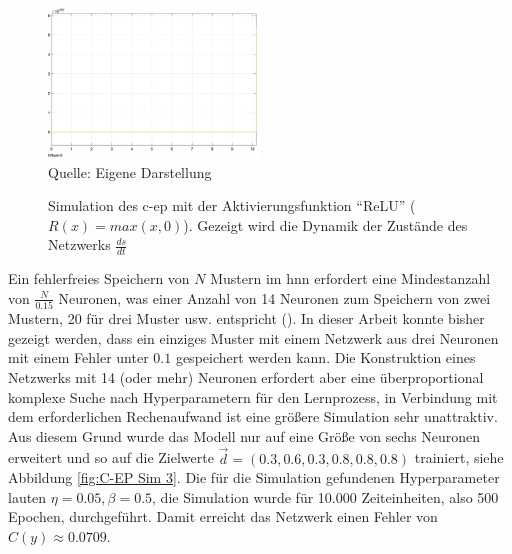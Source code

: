 \begin{figure}[h]
  \caption{Simulation des \ac{c-ep} mit der Aktivierungsfunktion "`ReLU"' (\(R(x)=max(x,0)\)). Gezeigt wird die Dynamik der Zustände des Netzwerks \(\frac{ds}{dt}\)}
  \centering
  \includegraphics[width=0.5\textwidth]{abbildungen/c_ep_sim_7_state_dynamics.png}
  \\
  Quelle: Eigene Darstellung
  \label{fig:C-EP Sim 7}
\end{figure}

Ein fehlerfreies Speichern von \(N\) Mustern im \ac{hnn} erfordert eine Mindestanzahl von \(\frac{N}{0.15}\) Neuronen, was einer Anzahl von 14 Neuronen zum Speichern von zwei Mustern, 20 für drei Muster usw. entspricht (\cite[vgl. S. 2556]{Hopfield1982}). In dieser Arbeit konnte bisher gezeigt werden, dass ein einziges Muster mit einem Netzwerk aus drei Neuronen mit einem Fehler unter \(0.1\) gespeichert werden kann. Die Konstruktion eines Netzwerks mit 14 (oder mehr) Neuronen erfordert aber eine überproportional komplexe Suche nach Hyperparametern für den Lernprozess, in Verbindung mit dem erforderlichen Rechenaufwand ist eine größere Simulation sehr unattraktiv. Aus diesem Grund wurde das Modell nur auf eine Größe von sechs Neuronen erweitert und so auf die Zielwerte \(\vec{d}=(0.3,0.6,0.3,0.8,0.8,0.8)\) trainiert, siehe Abbildung \ref{fig:C-EP Sim 3}. Die für die Simulation gefundenen Hyperparameter lauten \(\eta=0.05,\beta=0.5\), die Simulation wurde für 10.000 Zeiteinheiten, also 500 Epochen, durchgeführt. Damit erreicht das Netzwerk einen Fehler von \(C(y)\approx0.0709\).

